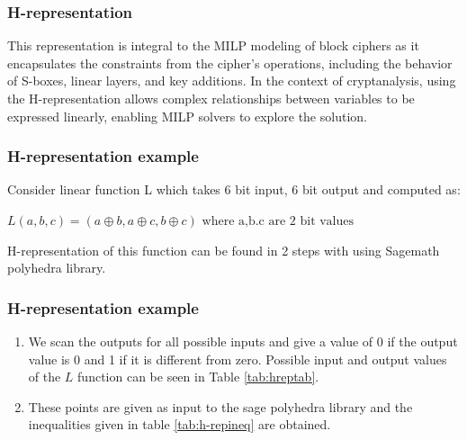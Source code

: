 \documentclass{beamer}
\begin{document}
\begin{frame}
    \frametitle{H-representation}
    This representation is integral to the MILP modeling of
    block ciphers as it encapsulates the constraints from the cipher’s operations, including
    the behavior of S-boxes, linear layers, and key additions.
    In the context of cryptanalysis, using the H-representation allows complex
    relationships between variables to be expressed linearly, enabling MILP solvers to
    explore the solution. 
\end{frame}
\begin{frame}
    \frametitle{H-representation example}
    Consider linear function L which takes 6 bit input, 6 bit output and computed as:
\begin{center}
    $L(a,b,c)=(a \oplus b , a \oplus c , b \oplus c ) \text{ where a,b.c are 2 bit values}  $
\end{center}
H-representation of this function can be found in 2 steps with using  Sagemath polyhedra library. \cite{sage}
\end{frame}
\begin{frame}
    \frametitle{H-representation example}
    \begin{enumerate}
    \item We scan the outputs for all possible inputs and give a value of 0 if the output value is 0 and 1 if it is different from zero. Possible input and output values of the $L$ function can be seen in Table \ref{tab:hreptab}.

    \item These points are given as input to the sage polyhedra library and the inequalities given in table \ref{tab:h-repineq} are obtained.
    
\end{enumerate}

    
\end{frame}
\end{document}
